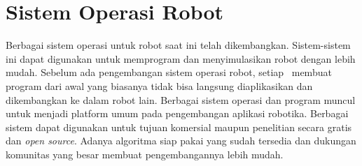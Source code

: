 \section{Sistem Operasi Robot}
\label{sec:ROS} 

    Berbagai sistem operasi untuk robot saat ini telah dikembangkan. Sistem-sistem ini dapat digunakan untuk memprogram dan menyimulasikan robot dengan lebih mudah.
    Sebelum ada pengembangan sistem operasi robot, setiap \dev\ membuat program dari awal yang biasanya tidak bisa langsung diaplikasikan dan dikembangkan ke dalam robot lain.
    Berbagai sistem operasi dan program muncul untuk menjadi platform umum pada pengembangan aplikasi robotika. Berbagai sistem dapat digunakan untuk tujuan komersial maupun penelitian secara gratis dan \textit{open source}. Adanya algoritma siap pakai yang sudah tersedia dan dukungan komunitas yang besar membuat pengembangannya lebih mudah.
    

